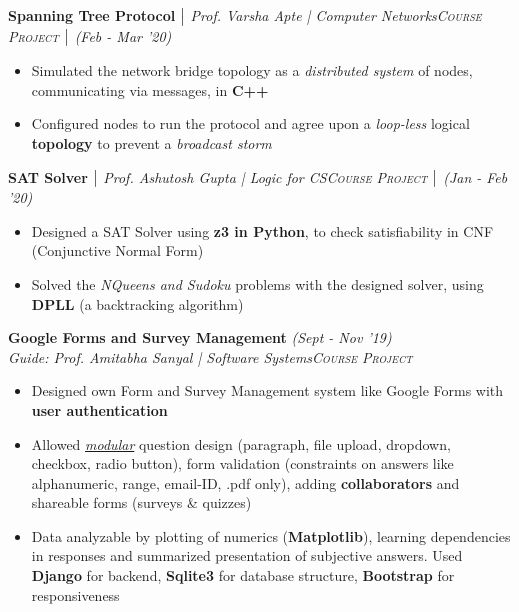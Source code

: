 \documentclass{article}
\begin{document}
\vspace{-5pt}
\textbf{Spanning Tree Protocol} $\bigm|$ {\it Prof. Varsha Apte | Computer Networks}\hfill{\sl \small \textsc{Course Project} $\bigm|$ (Feb - Mar '20)}\\
\vspace{-19pt}
\begin{itemize}[itemsep = -1 mm, leftmargin=*]
   \item Simulated the network bridge topology as a \textit{distributed system} of nodes, communicating via messages, in \textbf{C++}
    \item Configured nodes to run the protocol and agree upon a \textit{loop-less} logical \textbf{topology} to prevent a \textit{broadcast storm}
\end{itemize}
\vspace{-5pt}
\textbf{SAT Solver} $\bigm|$ {\it Prof. Ashutosh Gupta | Logic for CS}\hfill{\sl \small \textsc{Course Project} $\bigm|$ (Jan - Feb '20)}\\
\vspace{-19pt}
\begin{itemize}[itemsep = -1 mm, leftmargin=*]
   \item Designed a SAT Solver using \textbf{z3 in Python}, to check satisfiability in CNF (Conjunctive Normal Form)
    \item Solved the \textit{NQueens and Sudoku} problems with the designed solver, using \textbf{DPLL} (a backtracking algorithm)
\end{itemize}
\vspace{-5pt}
\textbf{Google Forms and Survey Management} \hfill{\sl \small (Sept - Nov '19)}\\
{\it Guide: Prof. Amitabha Sanyal | Software Systems}\hfill{\sl \small \textsc{Course Project}}\\
\vspace{-19pt}
\begin{itemize}[itemsep = -1 mm, leftmargin=*]
    \item Designed own Form and Survey Management system like Google Forms with \textbf{user authentication}
    \item Allowed \textit{\underline{modular}} question design (paragraph, file upload, dropdown, checkbox, radio button), form validation (constraints on answers like alphanumeric, range, email-ID, .pdf only), adding \textbf{collaborators} and shareable forms (surveys \& quizzes)
    \item Data analyzable by plotting of numerics (\textbf{Matplotlib}), learning dependencies in responses and summarized presentation of subjective answers. Used \textbf{Django} for backend, \textbf{Sqlite3} for database structure, \textbf{Bootstrap} for responsiveness
\end{itemize}
\end{document}
